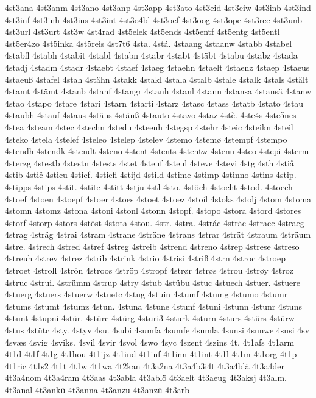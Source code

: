 4st3ana
4st3anm
4st3ano
4st3anp
4st3app
4st3ato
4st3eid
4st3eiw
4st3inb
4st3ind
4st3inf
4st3inh
4st3ins
4st3int
4st3o4bl
4st3oef
4st3oog
4st3ope
4st3rec
4st3unb
4st3url
4st3urt
4st3w
4st4rad
4st5elek
4st5ends
4st5entf
4st5entg
4st5entl
4st5er4zo
4st5inka
4st5reis
4st7t6
4sta.
4stá.
4staang
4staanw
4stabb
4stabel
4stabfl
4stabh
4stabit
4stabl
4stabn
4stabr
4stabt
4stäbt
4stabu
4stabz
4stada
4stadj
4stadm
4stadr
4staebt
4staef
4staeg
4staehn
4staelt
4staenz
4staep
4staeus
4staeuß
4stafel
4stah
4stähn
4stakk
4stakl
4stala
4stalb
4stale
4stalk
4stals
4stält
4stamt
4stämt
4stanb
4stanf
4stangr
4stanh
4stanl
4stann
4stansa
4stansä
4stanw
4stao
4stapo
4stare
4stari
4starn
4starti
4starz
4stasc
4stass
4statb
4stato
4stau
4staubh
4stauf
4staus
4stäus
4stäuß
4stauto
4stavo
4staz
4stě.
4ste4s
4ste5nes
4stea
4steam
4stec
4stechn
4stedu
4steenh
4stegsp
4stehr
4steic
4steikn
4steil
4steko
4stela
4stelef
4steleo
4stelep
4stelev
4stemo
4stemø
4stempf
4stempo
4stendh
4stendk
4stendt
4steno
4stent
4stents
4stentw
4stenu
4steo
4stepi
4sterm
4sterzg
4stestb
4stestn
4stests
4stet
4steuf
4steul
4steve
4stevi
4stg
4sth
4stiå
4stib
4stič
4sticu
4stief.
4stiefl
4stijd
4stild
4stime
4stimp
4stinno
4stins
4stip.
4stipps
4stips
4stit.
4stite
4stitt
4stju
4stl
4sto.
4stöch
4stocht
4stod.
4stoech
4stoef
4stoen
4stoepf
4stoer
4stoes
4stoet
4stoez
4stoil
4stoks
4stolj
4stom
4stoma
4stomn
4stomz
4stona
4stoni
4stonl
4stonn
4stopf.
4stopo
4stora
4stord
4stores
4storf
4storp
4stors
4stöst
4stota
4stou.
4str.
4stra.
4strác
4sträc
4straec
4straeg
4strag
4sträg
4strai
4stram
4strane
4sträne
4strans
4strar
4strät
4straum
4sträum
4stre.
4strech
4stred
4stref
4streg
4streib
4strend
4streno
4strep
4strese
4streso
4streuh
4strev
4strez
4strib
4strink
4strio
4strisi
4striß
4strn
4stroc
4stroep
4stroet
4stroll
4strön
4stroos
4ströp
4stropf
4strør
4strøs
4strou
4strøy
4stroz
4struc
4strui.
4strümm
4strup
4stry
4stub
4stübu
4stuc
4stuech
4stuer.
4stuere
4stuerg
4stuers
4stuerw
4stuetc
4stug
4stuin
4stumf
4stumg
4stumo
4stumr
4stums
4stumt
4stumz
4stun.
4stuna
4stune
4stunf
4stuni
4stunn
4stunr
4stuns
4stunt
4stupni
4stür.
4stürc
4stürg
4sturi3
4sturk
4sturn
4sturs
4stürs
4stürw
4stus
4stütc
4sty.
4styv
4su.
4subi
4sumfa
4sumfe
4sumla
4sunsi
4sunwe
4susi
4sv
4svæs
4svig
4sviks.
4svil
4svir
4svol
4swo
4syc
4szent
4szins
4t.
4t1afs
4t1arm
4t1d
4t1f
4t1g
4t1hou
4t1ijz
4t1ind
4t1inf
4t1inn
4t1int
4t1l
4t1m
4t1org
4t1p
4t1ric
4t1s2
4t1t
4t1w
4t1wa
4t2kan
4t3a2na
4t3a4b3i4t
4t3a4blä
4t3a4der
4t3a4nom
4t3a4ram
4t3aas
4t3abla
4t3ablö
4t3aelt
4t3aeug
4t3aksj
4t3alm.
4t3anal
4t3ankü
4t3anna
4t3anzu
4t3anzü
4t3arb
